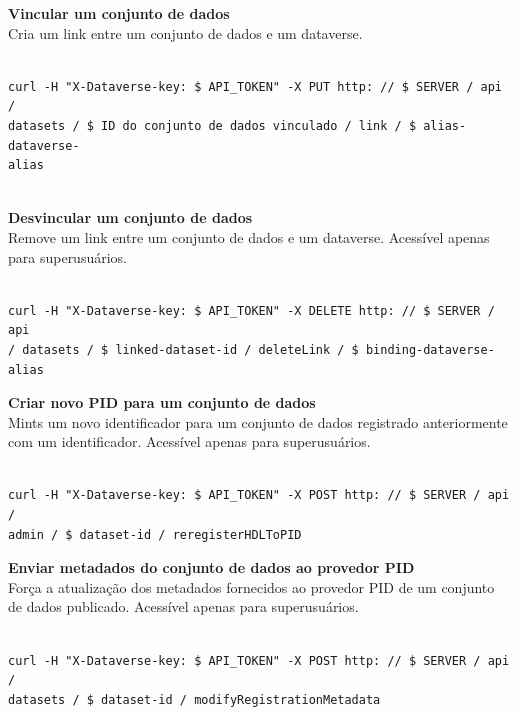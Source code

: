 \documentclass[12pt,hidelinks]{article}
\begin{document}
\textbf{Vincular um conjunto de dados}\\

Cria um link entre um conjunto de dados e um dataverse.

\begin{verbatim}

curl -H "X-Dataverse-key: $ API_TOKEN" -X PUT http: // $ SERVER / api /
datasets / $ ID do conjunto de dados vinculado / link / $ alias-
dataverse-
alias
 
\end{verbatim}
 
\textbf{Desvincular um conjunto de dados}\\

Remove um link entre um conjunto de dados e um dataverse. Acessível apenas para superusuários.

\begin{verbatim}

curl -H "X-Dataverse-key: $ API_TOKEN" -X DELETE http: // $ SERVER / api 
/ datasets / $ linked-dataset-id / deleteLink / $ binding-dataverse-alias

\end{verbatim}
 
\textbf{Criar novo PID para um conjunto de dados}\\

Mints um novo identificador para um conjunto de dados registrado anteriormente com um identificador. Acessível apenas para superusuários.

\begin{verbatim}

curl -H "X-Dataverse-key: $ API_TOKEN" -X POST http: // $ SERVER / api /
admin / $ dataset-id / reregisterHDLToPID

\end{verbatim}
 
\textbf{Enviar metadados do conjunto de dados ao provedor PID}\\

Força a atualização dos metadados fornecidos ao provedor PID de um conjunto de dados publicado. Acessível apenas para superusuários.

\begin{verbatim}

curl -H "X-Dataverse-key: $ API_TOKEN" -X POST http: // $ SERVER / api /
datasets / $ dataset-id / modifyRegistrationMetadata

\end{verbatim}
 
\end{document}
